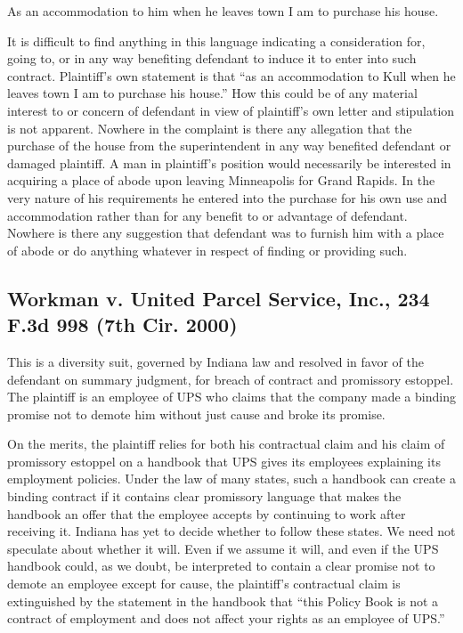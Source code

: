 \documentclass[
  letterpaper,
  11pt,
  DIV=9,
  openright]{scrbook}
\renewenvironment{quote}{
  \list{}{\leftmargin=2em\rightmargin=2em}
  \item\relax\small
}
{\endlist}
\begin{document}
\begin{quote}
As an accommodation to him when he leaves town I am to purchase his
house.
\end{quote}

It is difficult to find anything in this language indicating a
consideration for, going to, or in any way benefiting defendant to
induce it to enter into such contract. Plaintiff's own statement is that
``as an accommodation to Kull when he leaves town I am to purchase his
house.'' How this could be of any material interest to or concern of
defendant in view of plaintiff's own letter and stipulation is not
apparent. Nowhere in the complaint is there any allegation that the
purchase of the house from the superintendent in any way benefited
defendant or damaged plaintiff. A man in plaintiff's position would
necessarily be interested in acquiring a place of abode upon leaving
Minneapolis for Grand Rapids. In the very nature of his requirements he
entered into the purchase for his own use and accommodation rather than
for any benefit to or advantage of defendant. Nowhere is there any
suggestion that defendant was to furnish him with a place of abode or do
anything whatever in respect of finding or providing such.

\subsection{Workman v. United Parcel Service, Inc., 234 F.3d 998 (7th
Cir.
2000)}\label{workman-v.-united-parcel-service-inc.-234-f.3d-998-7th-cir.-2000}

This is a diversity suit, governed by Indiana law and resolved in favor
of the defendant on summary judgment, for breach of contract and
promissory estoppel. The plaintiff is an employee of UPS who claims that
the company made a binding promise not to demote him without just cause
and broke its promise.

On the merits, the plaintiff relies for both his contractual claim and
his claim of promissory estoppel on a handbook that UPS gives its
employees explaining its employment policies. Under the law of many
states, such a handbook can create a binding contract if it contains
clear promissory language that makes the handbook an offer that the
employee accepts by continuing to work after receiving it. Indiana has
yet to decide whether to follow these states. We need not speculate
about whether it will. Even if we assume it will, and even if the UPS
handbook could, as we doubt, be interpreted to contain a clear promise
not to demote an employee except for cause, the plaintiff's contractual
claim is extinguished by the statement in the handbook that ``this
Policy Book is not a contract of employment and does not affect your
rights as an employee of UPS.''
\end{document}
